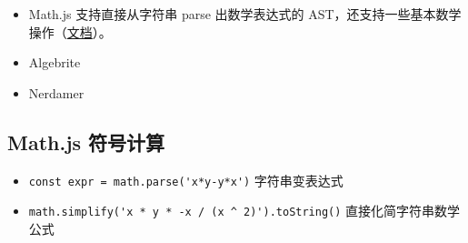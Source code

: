 
\begin{itemize}
\item Math.js 支持直接从字符串 parse 出数学表达式的 AST，还支持一些基本数学操作（\href{https://mathjs.org/docs/expressions/algebra.html}{文档}）。
\item Algebrite
\item Nerdamer
\end{itemize}

\subsection{Math.js 符号计算}
\begin{itemize}
\item \verb`const expr = math.parse('x*y-y*x')` 字符串变表达式
\item \verb`math.simplify('x * y * -x / (x ^ 2)').toString()` 直接化简字符串数学公式
\end{itemize}
